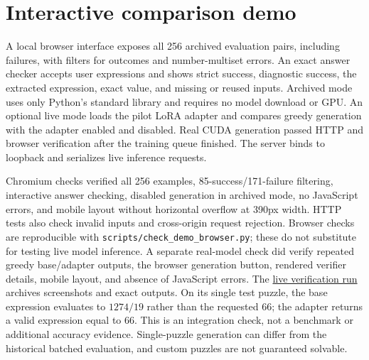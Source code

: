 \documentclass[11pt]{article}
\begin{document}
\section{Interactive comparison demo}
A local browser interface exposes all 256 archived evaluation pairs, including
failures, with filters for outcomes and number-multiset errors. An exact answer
checker accepts user expressions and shows strict success, diagnostic success,
the extracted expression, exact value, and missing or reused inputs. Archived
mode uses only Python's standard library and requires no model download or GPU.
An optional live mode loads the pilot LoRA adapter and compares greedy generation
with the adapter enabled and disabled. Real CUDA generation passed HTTP and
browser verification after the training queue finished.
The server binds to loopback and serializes live inference requests.

Chromium checks verified all 256 examples, 85-success/171-failure filtering,
interactive answer checking, disabled generation in archived mode, no JavaScript
errors, and mobile layout without horizontal overflow at 390px width. HTTP tests
also check invalid inputs and cross-origin request rejection. Browser checks are reproducible with
\texttt{scripts/check\_demo\_browser.py}; these do not substitute for testing live
model inference. A separate real-model check did verify repeated greedy
base/adapter outputs, the browser generation button, rendered verifier details,
mobile layout, and absence of JavaScript errors. The
\href{https://wandb.ai/mohamedsobhi777/countdown-grpo/runs/t3alv4y9}{live verification run}
archives screenshots and exact outputs. On its single test puzzle, the base
expression evaluates to $1274/19$ rather than the requested 66; the adapter
returns a valid expression equal to 66. This is an integration check, not a
benchmark or additional accuracy evidence. Single-puzzle generation can differ from the historical batched
evaluation, and custom puzzles are not guaranteed solvable.
\end{document}
